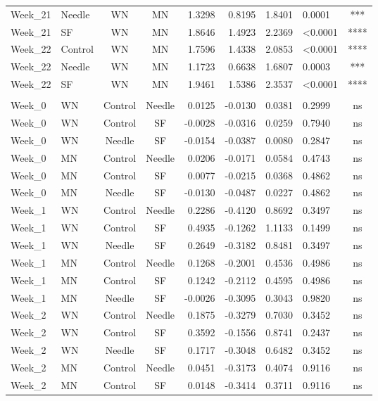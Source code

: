 \documentclass[
  12pt,
  letterpaper,
]{article}
\begin{document}
\begin{longtable}{llccrrrlc}
Week\_21 & Needle & WN & MN & 1.3298 & 0.8195 & 1.8401 & 0.0001 & *** \\ 
Week\_21 & SF & WN & MN & 1.8646 & 1.4923 & 2.2369 & <0.0001 & **** \\ 
Week\_22 & Control & WN & MN & 1.7596 & 1.4338 & 2.0853 & <0.0001 & **** \\ 
Week\_22 & Needle & WN & MN & 1.1723 & 0.6638 & 1.6807 & 0.0003 & *** \\ 
Week\_22 & SF & WN & MN & 1.9461 & 1.5386 & 2.3537 & <0.0001 & **** \\ 
\midrule\addlinespace[2.5pt]
\multicolumn{9}{l}{Split by Diet} \\[2.5pt] 
\midrule\addlinespace[2.5pt]
Week\_0 & WN & Control & Needle & 0.0125 & -0.0130 & 0.0381 & 0.2999 & ns \\ 
Week\_0 & WN & Control & SF & -0.0028 & -0.0316 & 0.0259 & 0.7940 & ns \\ 
Week\_0 & WN & Needle & SF & -0.0154 & -0.0387 & 0.0080 & 0.2847 & ns \\ 
Week\_0 & MN & Control & Needle & 0.0206 & -0.0171 & 0.0584 & 0.4743 & ns \\ 
Week\_0 & MN & Control & SF & 0.0077 & -0.0215 & 0.0368 & 0.4862 & ns \\ 
Week\_0 & MN & Needle & SF & -0.0130 & -0.0487 & 0.0227 & 0.4862 & ns \\ 
Week\_1 & WN & Control & Needle & 0.2286 & -0.4120 & 0.8692 & 0.3497 & ns \\ 
Week\_1 & WN & Control & SF & 0.4935 & -0.1262 & 1.1133 & 0.1499 & ns \\ 
Week\_1 & WN & Needle & SF & 0.2649 & -0.3182 & 0.8481 & 0.3497 & ns \\ 
Week\_1 & MN & Control & Needle & 0.1268 & -0.2001 & 0.4536 & 0.4986 & ns \\ 
Week\_1 & MN & Control & SF & 0.1242 & -0.2112 & 0.4595 & 0.4986 & ns \\ 
Week\_1 & MN & Needle & SF & -0.0026 & -0.3095 & 0.3043 & 0.9820 & ns \\ 
Week\_2 & WN & Control & Needle & 0.1875 & -0.3279 & 0.7030 & 0.3452 & ns \\ 
Week\_2 & WN & Control & SF & 0.3592 & -0.1556 & 0.8741 & 0.2437 & ns \\ 
Week\_2 & WN & Needle & SF & 0.1717 & -0.3048 & 0.6482 & 0.3452 & ns \\ 
Week\_2 & MN & Control & Needle & 0.0451 & -0.3173 & 0.4074 & 0.9116 & ns \\ 
Week\_2 & MN & Control & SF & 0.0148 & -0.3414 & 0.3711 & 0.9116 & ns \\ 

\end{longtable}
\end{document}
